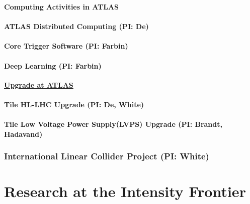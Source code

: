 \documentclass[11pt]{article}
\def\overhead#1{\part{#1}}
\def\onehead#1{\section{#1}}
\def\twohead#1{\subsection{#1}}
\def\centerhead#1{
	\begin{center}
	\Large\textbf{#1}
	\end{center}}
\begin{document}
\centerhead{Computing Activities in ATLAS}


\twohead{ATLAS Distributed Computing (PI: De)}


\twohead{Core Trigger Software (PI: Farbin)}

\twohead{Deep Learning (PI: Farbin)}


\begin{center}
\underline{\textbf{\huge Upgrade at ATLAS}}
\end{center}

\twohead{Tile HL-LHC Upgrade (PI: De, White)}

\twohead{Tile Low Voltage Power Supply(LVPS) Upgrade  (PI: Brandt, Hadavand)}
\label{sec:Tile-HL-LHC}



\onehead{International Linear Collider Project (PI: White)}









\newpage


\overhead{Research at the Intensity Frontier}




\end{document}

